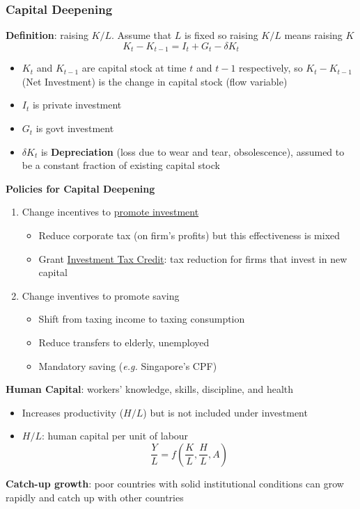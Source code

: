 \documentclass{article}
\newcommand{\eg}[0]{\textit{e.g. }}
\begin{document}
\begin{multicols}{2}
\subsubsection{Capital Deepening}
\textbf{Definition}: raising $K/L$. Assume that $L$ is fixed so raising $K/L$ means raising $K$
$$K_t - K_{t-1} = I_t + G_t - \delta K_t$$
\begin{itemize}
	\item $K_t$ and $K_{t-1}$ are capital stock at time $t$ and $t-1$ respectively, so $K_t - K_{t-1}$(Net Investment) is the change in capital stock (flow variable)
	\item $I_t$ is private investment
	\item $G_t$ is govt investment
	\item $\delta K_t$ is \textbf{Depreciation} (loss due to wear and tear, obsolescence), assumed to be a constant fraction of existing capital stock
\end{itemize}
\textbf{Policies for Capital Deepening}
\begin{enumerate}
	\item Change incentives to \underline{promote investment}
	\begin{itemize}
		\item Reduce corporate tax (on firm's profits) but this effectiveness is mixed
		\item Grant \underline{Investment Tax Credit}: tax reduction for firms that invest in new capital
	\end{itemize}
    \item Change inventives to promote saving
    \begin{itemize}
    	\item Shift from taxing income to taxing consumption
    	\item Reduce transfers to elderly, unemployed
    	\item Mandatory saving (\eg Singapore's CPF)
    \end{itemize}
\end{enumerate}
\textbf{Human Capital}: workers' knowledge, skills, discipline, and health
\begin{itemize}
	\item Increases productivity ($H/L$) but is not included under investment
	\item $H/L$: human capital per unit of labour
	$$\frac{Y}{L} = f\left(\frac{K}{L}, \frac{H}{L},A\right)$$
\end{itemize}
\textbf{Catch-up growth}: poor countries with solid institutional conditions can grow rapidly and catch up with other countries

\end{multicols}
\end{document}
